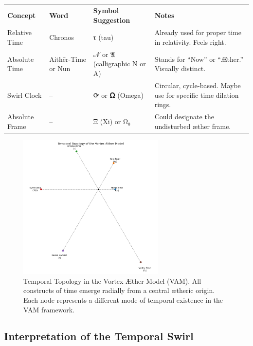 \documentclass[a4paper,12pt]{article}
\begin{document}
\begin{table}
    \centering
    \begin{tabular}{llll}
        \toprule
        \textbf{Concept} & \textbf{Word} & \textbf{Symbol Suggestion} & \textbf{Notes} \\
        \midrule
        Relative Time & Chronos & τ (tau) & Already used for proper time in relativity. Feels right. \\
        Absolute Time & Aithēr-Time or Nun & 𝒩 or 𝔄 (calligraphic N or A) & Stands for “Now” or “Æther.” Visually distinct. \\
        Swirl Clock & – & ⟳ or 𝛀 (Omega) & Circular, cycle-based. Maybe use for specific time dilation rings. \\
        Absolute Frame & – & Ξ (Xi) or Ω₀ & Could designate the undisturbed æther frame. \\
        \bottomrule
    \end{tabular}
    \caption{}
    \label{tab:}
\end{table}

    \begin{figure}[h!]
        \centering
        \includegraphics[width=0.65\textwidth]{TimeConstruct} %
        \caption{Temporal Topology in the Vortex Æther Model (VAM). All constructs of time emerge radially from a central ætheric origin. Each node represents a different mode of temporal existence in the VAM framework.}
        \label{fig:VAM-time-swirl}
    \end{figure}

    \subsection*{Interpretation of the Temporal Swirl}
\end{document}
